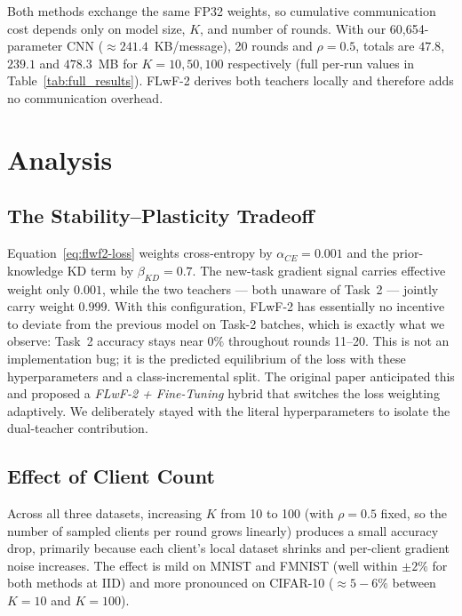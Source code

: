 \documentclass[journal]{IEEEtran}
\begin{document}
Both methods exchange the same FP32 weights, so cumulative
communication cost depends only on model size, $K$, and number of
rounds. With our 60{,}654-parameter CNN ($\approx 241.4$~KB/message),
20 rounds and $\rho{=}0.5$, totals are $47.8$, $239.1$ and
$478.3$~MB for $K{=}10,50,100$ respectively (full per-run values in
Table~\ref{tab:full_results}). FLwF-2 derives both teachers locally
and therefore adds no communication overhead.

\section{Analysis}
\label{sec:analysis}

\subsection{The Stability--Plasticity Tradeoff}

Equation~\ref{eq:flwf2-loss} weights cross-entropy by $\alpha_{CE}{=}0.001$
and the prior-knowledge KD term by $\beta_{KD}{=}0.7$. The new-task
gradient signal carries effective weight only $0.001$, while the two
teachers --- both unaware of Task~2 --- jointly carry weight $0.999$.
With this configuration, FLwF-2 has essentially no incentive to deviate
from the previous model on Task-2 batches, which is exactly what we
observe: Task~2 accuracy stays near $0\%$ throughout rounds 11--20.
This is not an implementation bug; it is the predicted equilibrium of
the loss with these hyperparameters and a class-incremental split.
The original paper anticipated this and proposed a
\emph{FLwF-2 + Fine-Tuning} hybrid that switches the loss weighting
adaptively. We deliberately stayed with the literal hyperparameters to
isolate the dual-teacher contribution.

\subsection{Effect of Client Count}

Across all three datasets, increasing $K$ from 10 to 100 (with
$\rho{=}0.5$ fixed, so the number of sampled clients per round grows
linearly) produces a small accuracy drop, primarily because each
client's local dataset shrinks and per-client gradient noise
increases. The effect is mild on MNIST and FMNIST (well within
$\pm 2\%$ for both methods at IID) and more pronounced on CIFAR-10
($\approx 5{-}6\%$ between $K{=}10$ and $K{=}100$).
\end{document}
